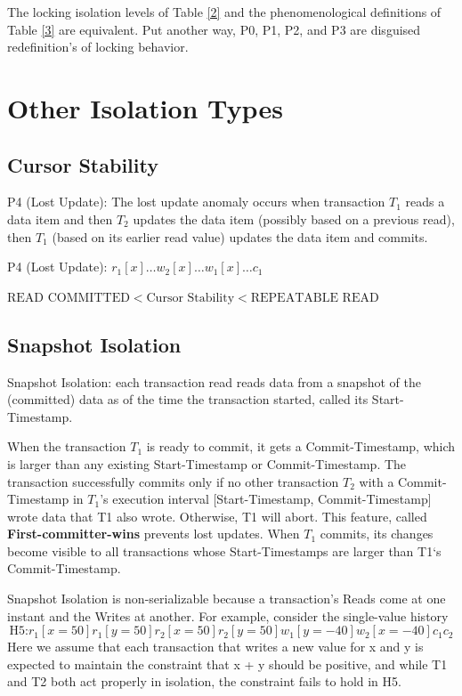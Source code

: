 \documentclass[11pt]{article}
\begin{document}
\begin{remark}[]
The locking isolation levels of Table \ref{2} and the phenomenological definitions of Table \ref{3} are
equivalent. Put another way, P0, P1, P2, and P3 are disguised redefinition’s of locking behavior.
\end{remark}
\section{Other Isolation Types}
\label{sec:org905a0f8}
\subsection{Cursor Stability}
\label{sec:org15cd7d7}
P4 (Lost Update): The lost update anomaly occurs when transaction \(T_1\) reads a data item and then
\(T_2\) updates the data item (possibly based on a previous read), then \(T_1\) (based on its earlier
read value) updates the data item and commits.

\begin{center}
P4 (Lost Update): \(r_1[x]\dots w_2[x]\dots w_1[x]\dots c_1\)
\end{center}

\begin{remark}[]
\(\text{READ COMMITTED} < \text{Cursor Stability}<\text{REPEATABLE READ}\)
\end{remark}
\subsection{Snapshot Isolation}
\label{sec:orge725d60}
Snapshot Isolation: each transaction read reads data from a snapshot of the (committed) data as of the
time the transaction started, called its Start-Timestamp.

When the transaction \(T_1\) is ready to commit, it gets a Commit-Timestamp, which is larger than any
existing Start-Timestamp or Commit-Timestamp. The transaction successfully commits only if no other
transaction \(T_2\) with a Commit-Timestamp in \(T_1\)’s execution interval [Start-Timestamp,
Commit-Timestamp] wrote data that T1 also wrote. Otherwise, T1 will abort. This feature, called
\textbf{First-committer-wins} prevents lost updates. When \(T_1\) commits, its changes become visible to all
transactions whose Start-Timestamps are larger than T1‘s Commit-Timestamp.

Snapshot Isolation is non-serializable because a transaction's Reads come at one instant and the
Writes at another. For example, consider the single-value history
\begin{equation*}
\text{H5:} r_1[x=50]r_1[y=50]r_2[x=50]r_2[y=50]w_1[y=-40]w_2[x=-40]c_1c_2
\end{equation*}
Here we assume that each transaction that writes a new value for x and y is expected to maintain the
constraint that x + y should be positive, and while T1 and T2 both act properly in isolation, the
constraint fails to hold in H5.
\end{document}
